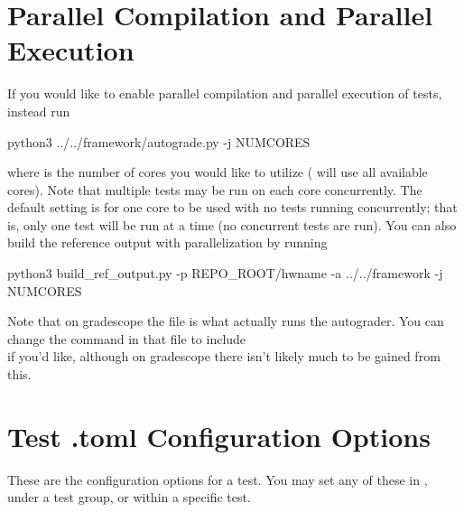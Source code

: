 \documentclass[11pt]{report}
\begin{document}
\section*{Parallel Compilation and Parallel Execution}
If you would like to enable parallel compilation and parallel execution of tests, instead run 
\begin{bashcodeblock}
python3 ../../framework/autograde.py -j NUMCORES
\end{bashcodeblock}
where  is the number of cores 
you would like to utilize ( will use all available cores). Note that multiple tests may be 
run on each core concurrently. The default setting is for one core to be used with no tests running 
concurrently; that is, only one test will be run at a time (no concurrent tests are run). You can
also build the reference output with parallelization by running 
\begin{bashcodeblock}
python3 build_ref_output.py -p REPO_ROOT/hwname -a ../../framework -j NUMCORES
\end{bashcodeblock}
Note that on gradescope the file  is what actually runs the autograder. You can 
change the command in that file to include \\ if you'd like, although on 
gradescope there isn't likely much to be gained from this.  

\section*{Test .toml Configuration Options}
These are the configuration options for a test. You may set any of these in \code{[common]},
under a test group, or within a specific test.\\ 
\end{document}
